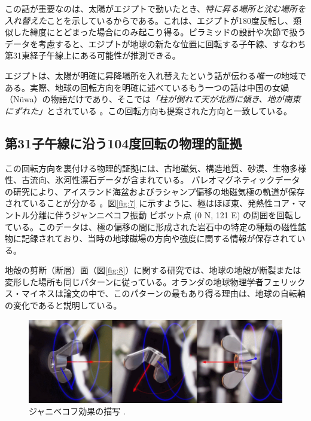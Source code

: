 \documentclass[10pt,twocolumn,letterpaper]{article}
\begin{document}
この話が重要なのは、太陽がエジプトで動いたとき、\textit{特に昇る場所と沈む場所を入れ替えた}ことを示しているからである。これは、エジプトが180度反転し、類似した緯度にとどまった場合にのみ起こり得る。ピラミッドの設計や次節で扱うデータを考慮すると、エジプトが地球の新たな位置に回転する子午線、すなわち第31東経子午線上にある可能性が推測できる。

エジプトは、太陽が明確に昇降場所を入れ替えたという話が伝わる\textit{唯一の}地域である。実際、地球の回転方向を明確に述べているもう一つの話は中国の女媧（Nüwa）の物語だけであり、そこでは\textit{「柱が倒れて天が北西に傾き、地が南東にずれた」}とされている \cite{8}。この回転方向も提案された方向と一致している。

\subsection{第31子午線に沿う104度回転の物理的証拠}

この回転方向を裏付ける物理的証拠には、古地磁気、構造地質、砂漠、生物多様性、古流向、氷河性漂石データが含まれている。
パレオマグネティックデータの研究により、アイスランド海盆およびラシャンプ偏移の地磁気極の軌道が保存されていることが分かる \cite{35}。図\ref{fig:7} に示すように、極はほぼ東、発熱性コア・マントル分離に伴うジャンニベコフ振動 ピボット点 (0 N, 121 E) の周囲を回転している。このデータは、極の偏移の間に形成された岩石中の特定の種類の磁性鉱物に記録されており、当時の地球磁場の方向や強度に関する情報が保存されている。

地殻の剪断（断層）面（図\ref{fig:8}）に関する研究では、地球の地殻が断裂または変形した場所も同じパターンに従っている。オランダの地球物理学者フェリックス・マイネスは論文\cite{36}の中で、このパターンの最もあり得る理由は、地球の自転軸の変化であると説明している。

\begin{figure}[b]
\begin{center}
\includegraphics[width=1\textwidth]{dzhani.jpg}
\end{center}
   \caption{ジャニベコフ効果の描写 \cite{28}.}
\label{fig:10}
\end{figure}
\end{document}
